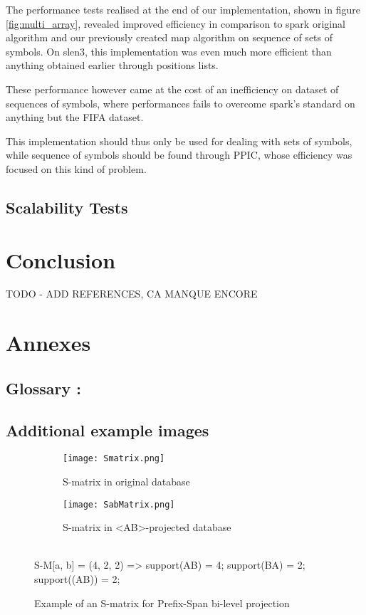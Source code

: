 \documentclass{eplmastersthesis}
\begin{document}
The performance tests realised at the end of our implementation, shown in figure \ref{fig:multi_array}, revealed improved efficiency in comparison to spark original algorithm and our previously created map algorithm on sequence of sets of symbols. On slen3, this implementation was even much more efficient than anything obtained earlier through positions lists. \newline

These performance however came at the cost of an inefficiency on dataset of sequences of symbols, where performances fails to overcome spark's standard on anything but the FIFA dataset. \newline

This implementation should thus only be used for dealing with sets of symbols, while sequence of symbols should be found through PPIC, whose efficiency was focused on this kind of problem.

\subsection{Scalability Tests}

\section{Conclusion}

\clearpage
TODO - ADD REFERENCES, CA MANQUE ENCORE
\nocite{*}



\clearpage
\section{Annexes}

\subsection{Glossary :}

\printglossary[type=\acronymtype]

\subsection{Additional example images}

\begin{figure*}[h]
  \centering
  \begin{subfigure}[t]{0.5\textwidth}
  	\centering
    \texttt{[image: Smatrix.png]}
    \caption{S-matrix in original database}
  \end{subfigure}
  \begin{subfigure}[t]{0.49\textwidth}
  	\centering
    \texttt{[image: SabMatrix.png]}
    \caption{S-matrix in <AB>-projected database}
  \end{subfigure}
  \vspace{5px} \\
  S-M[a, b] = (4, 2, 2) => support(AB) = 4; support(BA) = 2; support((AB)) = 2;
  \caption{Example of an S-matrix for Prefix-Span bi-level projection}
  \label{fig:smatrix}
\end{figure*}
\end{document}
